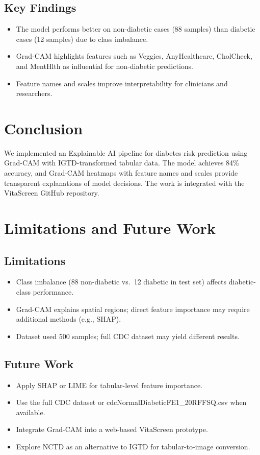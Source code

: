 \documentclass[12pt]{dalthesis}
\begin{document}
\section{Key Findings}

\begin{itemize}
\item The model performs better on non-diabetic cases (88 samples) than diabetic cases (12 samples) due to class imbalance.
\item Grad-CAM highlights features such as Veggies, AnyHealthcare, CholCheck, and MentHlth as influential for non-diabetic predictions.
\item Feature names and scales improve interpretability for clinicians and researchers.
\end{itemize}

\chapter{Conclusion}\label{ch:conclusion}

We implemented an Explainable AI pipeline for diabetes risk prediction using Grad-CAM with IGTD-transformed tabular data. The model achieves 84\% accuracy, and Grad-CAM heatmaps with feature names and scales provide transparent explanations of model decisions. The work is integrated with the VitaScreen GitHub repository.

\chapter{Limitations and Future Work}
\section{Limitations}

\begin{itemize}
\item Class imbalance (88 non-diabetic vs.\ 12 diabetic in test set) affects diabetic-class performance.
\item Grad-CAM explains spatial regions; direct feature importance may require additional methods (e.g., SHAP).
\item Dataset used 500 samples; full CDC dataset may yield different results.
\end{itemize}

\section{Future Work}

\begin{itemize}
\item Apply SHAP or LIME for tabular-level feature importance.
\item Use the full CDC dataset or cdcNormalDiabeticFE1\_20RFFSQ.csv when available.
\item Integrate Grad-CAM into a web-based VitaScreen prototype.
\item Explore NCTD as an alternative to IGTD for tabular-to-image conversion.
\end{itemize}



\end{document}
